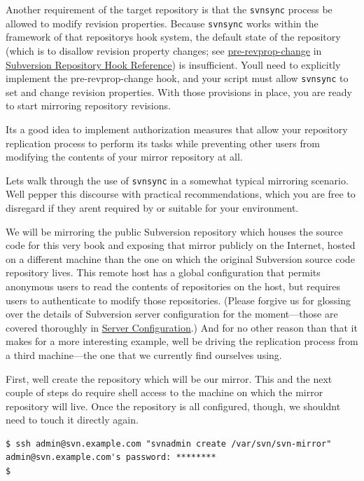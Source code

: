 Another requirement of the target repository is that the
\texttt{svnsync} process be allowed to modify revision properties.
Because \texttt{svnsync} works within the framework of that
repository\textquotesingle s hook system, the default state of the
repository (which is to disallow revision property changes; see
\hyperref[svn.ref.reposhooks.pre-revprop-change]{pre-revprop-change} in
\hyperref[svn.ref.reposhooks]{Subversion Repository Hook Reference}) is
insufficient. You\textquotesingle ll need to explicitly implement the
pre-revprop-change hook, and your script must allow \texttt{svnsync} to
set and change revision properties. With those provisions in place, you
are ready to start mirroring repository revisions.

It\textquotesingle s a good idea to implement authorization measures
that allow your repository replication process to perform its tasks
while preventing other users from modifying the contents of your mirror
repository at all.

Let\textquotesingle s walk through the use of \texttt{svnsync} in a
somewhat typical mirroring scenario. We\textquotesingle ll pepper this
discourse with practical recommendations, which you are free to
disregard if they aren\textquotesingle t required by or suitable for
your environment.

We will be mirroring the public Subversion repository which houses the
source code for this very book and exposing that mirror publicly on the
Internet, hosted on a different machine than the one on which the
original Subversion source code repository lives. This remote host has a
global configuration that permits anonymous users to read the contents
of repositories on the host, but requires users to authenticate to
modify those repositories. (Please forgive us for glossing over the
details of Subversion server configuration for the moment---those are
covered thoroughly in \hyperref[svn.serverconfig]{Server
Configuration}.) And for no other reason than that it makes for a more
interesting example, we\textquotesingle ll be driving the replication
process from a third machine---the one that we currently find ourselves
using.

First, we\textquotesingle ll create the repository which will be our
mirror. This and the next couple of steps do require shell access to the
machine on which the mirror repository will live. Once the repository is
all configured, though, we shouldn\textquotesingle t need to touch it
directly again.

\begin{verbatim}
$ ssh admin@svn.example.com "svnadmin create /var/svn/svn-mirror"
admin@svn.example.com's password: ********
$
\end{verbatim}

